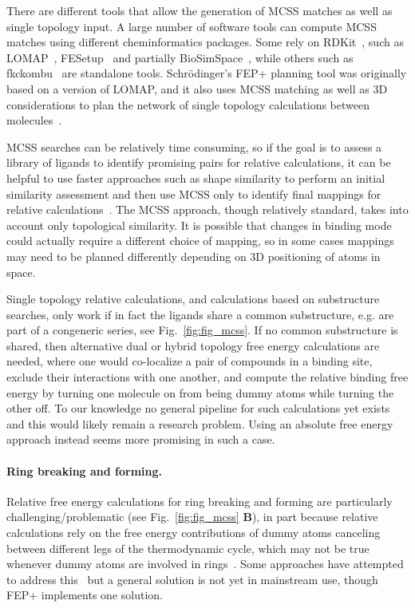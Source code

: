 \documentclass[9pt,bestpractices]{livecoms}
\begin{document}
There are different tools that allow the generation of MCSS matches as well as single topology input. A large number of software tools can compute MCSS matches using different cheminformatics packages. Some rely on RDKit~\cite{rdkit2019Dec}, such as LOMAP~\cite{liu2013lead}, FESetup~\cite{loeffler2015fesetup} and partially BioSimSpace~\cite{hedges2019biosimspace}, while others such as fkckombu~\cite{kawabata20143d} are standalone tools. Schr\"{o}dinger's FEP+ planning tool was originally based on a version of LOMAP, and it also uses MCSS matching as well as 3D considerations to plan the network of single topology calculations between molecules~\cite{wang2015accurate}. 

MCSS searches can be relatively time consuming, so if the goal is to assess a library of ligands to identify promising pairs for relative calculations, it can be helpful to use faster approaches such as shape similarity to perform an initial similarity assessment and then use MCSS only to identify final mappings for relative calculations~\cite{raymond2002maximum,klabunde2012mars,jones2009elucidating}. The MCSS approach, though relatively standard, takes into account only topological similarity. It is possible that changes in binding mode could actually require a different choice of mapping, so in some cases mappings may need to be planned differently depending on 3D positioning of atoms in space.

Single topology relative calculations, and calculations based on substructure searches, only work if in fact the ligands share a common substructure, e.g. are part of a congeneric series, see Fig.~\ref{fig:fig_mcss}.
If no common substructure is shared, then alternative dual or hybrid topology free energy calculations are needed, where one would co-localize a pair of compounds in a binding site, exclude their interactions with one another, and compute the relative binding free energy by turning one molecule on from being dummy atoms while turning the other off.
To our knowledge no general pipeline for such calculations yet exists and this would likely remain a research problem. Using an absolute free energy approach instead seems more promising in such a case. 

\paragraph{Ring breaking and forming.} Relative free energy calculations for ring breaking and forming are particularly challenging/problematic (see Fig.~\ref{fig:fig_mcss} \textbf{B}), in part because relative calculations rely on the free energy contributions of dummy atoms canceling between different legs of the thermodynamic cycle, which may not be true whenever dummy atoms are involved in rings~\cite{liu2015ring}.
Some approaches have attempted to address this~\cite{clark2019relative} but a general solution is not yet in mainstream use, though FEP+ implements one solution.
\end{document}
